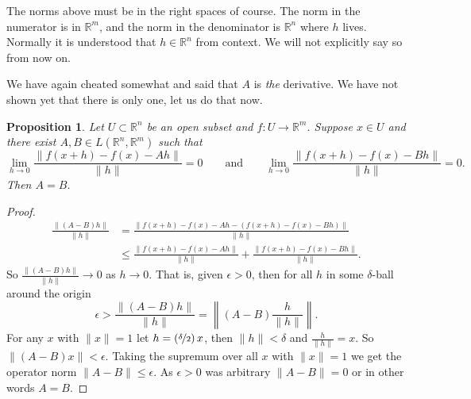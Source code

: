 \documentclass[12pt]{book}
\newcommand{\snorm}[1]{\lVert {#1} \rVert}
\newcommand{\norm}[1]{\left\lVert {#1} \right\rVert}
\newcommand{\R}{{\mathbb{R}}}
\theoremstyle{plain}
\newtheorem{prop}[thm]{Proposition}
\theoremstyle{remark}
\theoremstyle{definition}
\theoremstyle{exercise}
\theoremstyle{example}
\begin{document}
The norms above must be in the right spaces of course.  The norm in the
numerator is in $\R^m$, and the norm in the denominator is $\R^n$ where $h$
lives.
Normally it is 
understood that $h \in \R^n$ from context.
We will not explicitly say so from now on.

We have again cheated somewhat and said that $A$
is \emph{the} derivative.  We have not shown yet that there
is only one, let us do that now.

\begin{prop}
Let $U \subset \R^n$ be an open subset and $f \colon U \to \R^m$.  Suppose
$x \in U$ and there exist 
$A,B \in L(\R^n,\R^m)$ such that
\begin{equation*}
\lim_{h \to 0}
\frac{\snorm{f(x+h)-f(x) - Ah}}{\snorm{h}} = 0
\qquad \text{and} \qquad
\lim_{h \to 0}
\frac{\snorm{f(x+h)-f(x) - Bh}}{\snorm{h}} = 0 .
\end{equation*}
Then $A=B$.
\end{prop}

\begin{proof}
\begin{equation*}
\begin{split}
\frac{\snorm{(A-B)h}}{\snorm{h}} & =
\frac{\snorm{f(x+h)-f(x) - Ah - (f(x+h)-f(x) - Bh)}}{\snorm{h}} \\
& \leq
\frac{\snorm{f(x+h)-f(x) - Ah}}{\snorm{h}} + \frac{\snorm{f(x+h)-f(x) -
Bh}}{\snorm{h}} .
\end{split}
\end{equation*}
So 
$\frac{\snorm{(A-B)h}}{\snorm{h}} \to 0$ as $h \to 0$.  That is, given
$\epsilon > 0$, then for all $h$ in some $\delta$-ball around
the origin
\begin{equation*}
\epsilon > 
\frac{\snorm{(A-B)h}}{\snorm{h}}
=
\norm{(A-B)\frac{h}{\snorm{h}}} .
\end{equation*}
For any $x$ with $\snorm{x}=1$
let $h = (\nicefrac{\delta}{2}) \, x$, then $\snorm{h} < \delta$
and $\frac{h}{\snorm{h}} = x$.
So $\snorm{(A-B)x} < \epsilon$.  Taking the supremum over all $x$ with
$\snorm{x} = 1$ we get the operator norm
$\snorm{A-B} \leq \epsilon$.  As $\epsilon > 0$
was arbitrary $\snorm{A-B} = 0$ or in other words $A = B$.
\end{proof}
\end{document}
